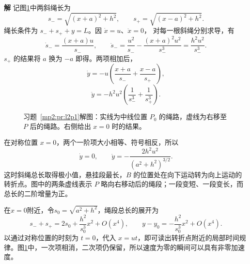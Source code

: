 \documentclass[11pt,openany,fontset=fandol]{ctexbook}
\theoremstyle{definition}\newtheorem{example}{例}[chapter]\newtheorem{exercise}{习题}[chapter]
\newcommand{\SolutionStart}{\par\medskip\ifdim\pagetotal>0pt\ifdim\dimexpr\pagegoal-\pagetotal\relax<3\baselineskip\newpage\fi\fi\noindent\textbf{解}\quad\ignorespaces}
\newenvironment{solution}{\SolutionStart}{\par\medskip}
\begin{document}
\begin{solution}
记图\ref{mp2:fig:l2p1-s}中两斜绳长为
\[
s_-=\sqrt{(x+a)^2+h^2},\qquad s_+=\sqrt{(x-a)^2+h^2}.
\]
绳长条件为 $s_-+s_++y=L$。因 $\dot x=u$、$\ddot x=0$，
对每一根斜绳分别求导，有
\[
\dot s_-=\frac{(x+a)u}{s_-},\qquad
\ddot s_-=\frac{u^2}{s_-}-\frac{(x+a)^2u^2}{s_-^3}
=\frac{h^2u^2}{s_-^3}.
\]
$s_+$ 的结果将 $a$ 换为 $-a$ 即得。两项相加后，
\[
\dot y=-u\left(\frac{x+a}{s_-}+\frac{x-a}{s_+}\right),
\]
\[
\ddot y=-h^2u^2\left(\frac1{s_-^3}+\frac1{s_+^3}\right).
\]

\begin{figure}[H]\centering
{}
\caption{习题~\ref{mp2:pr:l2p1}解图：实线为中线位置 $P_0$ 的绳路，虚线为右移至 $P$ 后的绳路。右侧给出 $x=0$ 时的结果。}\label{mp2:fig:l2p1-s}
\end{figure}

在对称位置 $x=0$，两个一阶项大小相等、符号相反，所以
\[
\dot y=0,\qquad \ddot y=-\frac{2h^2u^2}{(a^2+h^2)^{3/2}}.
\]
这时斜绳总长取得极小值，悬挂段最长，$B$ 的位置处在向下运动转为向上运动的转折点。图中的两条虚线表示 $P$ 略向右移动后的绳段；一段变短、一段变长，而总长的二阶增量为正。

在$x=0$附近，令$s_0=\sqrt{a^2+h^2}$，绳段总长的展开为
\[
 s_-+s_+=2s_0+\frac{h^2}{s_0^3}x^2+O(x^4),
 \qquad y-y_0=-\frac{h^2}{s_0^3}x^2+O(x^4).
\]
以通过对称位置的时刻为 $t=0$，代入 $x=ut$，即可读出转折点附近的局部时间规律。图\ref{mp2:fig:l2p1-s}中，一次项相消，二次项仍保留，所以速度为零的瞬间可以具有非零加速度。
\end{solution}
\end{document}
